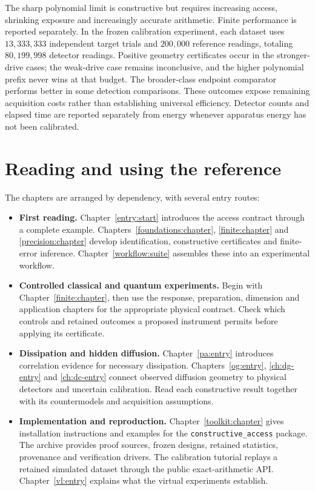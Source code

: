 The sharp polynomial limit is constructive but requires increasing access,
shrinking exposure and increasingly accurate arithmetic. Finite performance
is reported separately. In the frozen calibration experiment, each dataset
uses $13{,}333{,}333$ independent target trials and $200{,}000$ reference
readings, totaling $80{,}199{,}998$ detector readings. Positive geometry
certificates occur in the stronger-drive cases; the weak-drive case remains
inconclusive, and the higher polynomial prefix never wins at that budget.
The broader-class endpoint comparator performs better in some detection
comparisons. These outcomes expose remaining acquisition costs rather than
establishing universal efficiency. Detector counts and elapsed time are
reported separately from energy whenever apparatus energy has not been
calibrated.

\section*{Reading and using the reference}

The chapters are arranged by dependency, with several entry routes:
\begin{itemize}[leftmargin=1.5em]
\item \textbf{First reading.}
Chapter~\ref{entry:start} introduces the access contract through a complete
example. Chapters~\ref{foundations:chapter}, \ref{finite:chapter} and
\ref{precision:chapter} develop identification, constructive certificates
and finite-error inference. Chapter~\ref{workflow:suite} assembles these
into an experimental workflow.
\item \textbf{Controlled classical and quantum experiments.}
Begin with Chapter~\ref{finite:chapter}, then use the response, preparation,
dimension and application chapters for the appropriate physical contract.
Check which controls and retained outcomes a proposed instrument permits
before applying its certificate.
\item \textbf{Dissipation and hidden diffusion.}
Chapter~\ref{pa:entry} introduces correlation evidence for necessary
dissipation. Chapters~\ref{og:entry}, \ref{ch:dg-entry} and
\ref{ch:dc-entry} connect observed diffusion geometry to physical detectors
and uncertain calibration. Read each constructive result together with its
countermodels and acquisition assumptions.
\item \textbf{Implementation and reproduction.}
Chapter~\ref{toolkit:chapter} gives installation instructions and examples
for the \texttt{constructive\_access} package. The archive provides
proof sources, frozen designs, retained statistics, provenance and verification
drivers. The calibration tutorial replays a retained simulated dataset through
the public exact-arithmetic API. Chapter~\ref{vl:entry} explains what the
virtual experiments establish.
\end{itemize}

